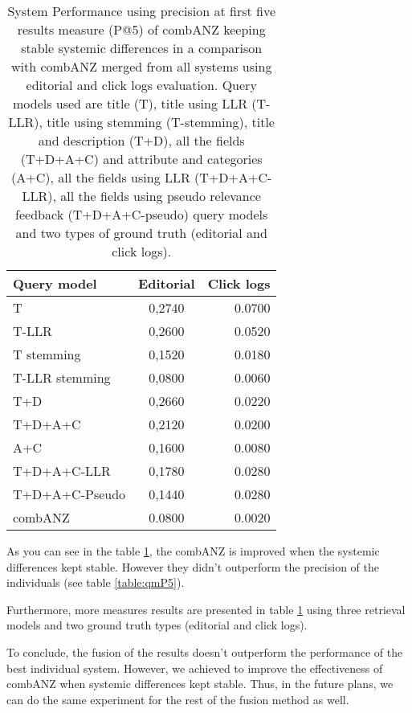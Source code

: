 \begin{table}[H]
\begin{center}
\footnotesize
\caption{System Performance using precision at first five results measure (P@5) of combANZ keeping stable systemic differences in a comparison with combANZ merged from all systems using editorial and click logs evaluation. Query models used are title (T), title using LLR (T-LLR), title using stemming (T-stemming), title and description (T+D), all the fields (T+D+A+C) and attribute and categories (A+C), all the fields using LLR (T+D+A+C-LLR), all the fields using pseudo relevance feedback (T+D+A+C-pseudo) query models and two types of ground truth (editorial and click logs).}
\label{table:combANZ}
\begin{tabular}{lcr}
\midrule
 Query model & Editorial & Click logs \\
 \midrule
	T & 0,2740 & 0.0700 \\
	T-LLR & 0,2600 & 0.0520 \\
	T stemming & 0,1520 & 0.0180 \\
	T-LLR stemming & 0,0800 & 0.0060 \\
	T+D & 0,2660 & 0.0220 \\
	T+D+A+C & 0,2120 & 0.0200 \\
	A+C & 0,1600 & 0.0080 \\
	T+D+A+C-LLR & 0,1780 & 0.0280 \\
	T+D+A+C-Pseudo & 0,1440 & 0.0280 \\
	\midrule
	combANZ & 0.0800 & 0.0020 \\
\bottomrule
\end{tabular}
\end{center}
\end{table}



As you can see in the table \ref{table:combANZ}, the combANZ is improved when the systemic differences kept stable. However they didn't outperform the precision of the individuals (see table \ref{table:qmP5}).


Furthermore, more measures results are presented in table \ref{table:combANZ} using three retrieval models and two ground truth types (editorial and click logs).

To conclude, the fusion of the results doesn't outperform the performance of the best individual system. However, we achieved to improve the effectiveness of combANZ when systemic differences kept stable. Thus, in the future plans, we can do the same experiment for the rest of the fusion method as well.

